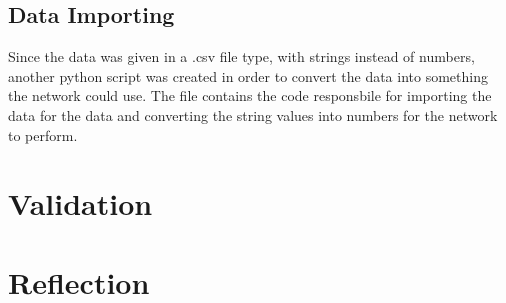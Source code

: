 \documentclass[10pt]{article}
\begin{document}
\subsection{Data Importing}
Since the data was given in a .csv file type, with strings instead of numbers, another python script was created in order to convert the data into something the network could use. The file  contains the code responsbile for importing the data for the data and converting the string values into numbers for the network to perform.
\section{Validation}
\section{Reflection}
\end{document}
